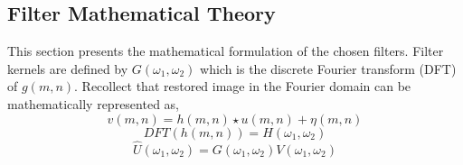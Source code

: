 \graphicspath{{mehul_pics/}}%
\subsection{Filter Mathematical Theory~\cite{Jain:1989}} %
This section presents the mathematical formulation of the chosen filters. Filter kernels are defined by $G(\omega_1,\omega_2)$ which is the discrete Fourier transform (DFT) of $g(m,n)$. Recollect that restored image in the Fourier domain can be mathematically represented as,
\begin{equation}
v(m,n)= h(m,n) \star u(m,n) + \eta(m,n)
\end{equation}
\begin{equation}
DFT(h(m,n)) = H(\omega_1,\omega_2)
\end{equation}
\begin{equation}
\hat{U}(\omega_1,\omega_2)= G(\omega_1,\omega_2)V(\omega_1,\omega_2)
\end{equation}

